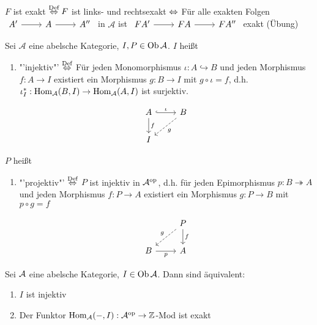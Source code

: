 \begin{anm}
	$F$ ist exakt $\overset{\text{Def}}{\Leftrightarrow} F$ ist links- und rechtsexakt $\Leftrightarrow$ Für alle exakten Folgen $\begin{tikzcd}
	A' \arrow{r} & A \arrow{r} & A''
	\end{tikzcd}$ in $\mathcal{A}$ ist $\begin{tikzcd}
	FA' \arrow{r} & FA \arrow{r} & FA''
	\end{tikzcd}$ exakt (Übung)
\end{anm}
\begin{df}
	Sei $\mathcal{A}$ eine abelsche Kategorie, $I,P \in \text{Ob}\,\mathcal{A}$. $I$ heißt
	\begin{enumerate}
		\item[] 
		 \begin{minipage}[t]{0.7\textwidth}
		"'injektiv"' $\overset{\text{Def}}{\Leftrightarrow}$ Für jeden Monomorphismus $\iota: A \hookrightarrow B$ und jeden Morphismus $f: A \to I$ existiert ein Morphismus $g:B \to I$ mit $g\circ \iota = f$, d.h. $\iota_I^*: \operatorname{Hom}_{\mathcal{A}}(B,I) \to \operatorname{Hom}_{\mathcal{A}}(A,I)$ ist surjektiv.	
		\end{minipage}
		\begin{minipage}[t]{0.3\textwidth} 
			$$\begin{tikzcd}
			A \arrow[hook]{r}{\iota} \arrow{d}{f} & B\arrow[dashed]{dl}{g} \\
			I & 
			\end{tikzcd}$$
		\end{minipage}
	\end{enumerate}
	$P$ heißt
	\begin{enumerate}

	\item[] \begin{minipage}[t]{0.7\textwidth}
		"'projektiv"' $\overset{\text{Def}}{\Leftrightarrow}$ $P$ ist injektiv in $\mathcal{A}^\text{op}$, d.h. für jeden Epimorphismus $p: B\twoheadrightarrow A$ und jeden Morphismus $f:P \to A$ existiert ein Morphismus $g:P \to B$ mit $p \circ g = f$
	\end{minipage}
	\begin{minipage}[t]{0.3\textwidth} 
		$$\begin{tikzcd}
		& P\arrow[dashed, swap]{dl}{g} \arrow{d}{f} \\
		B \arrow[swap]{r}{p} & A
		\end{tikzcd}$$
	\end{minipage}
	\end{enumerate}
\end{df}
\begin{bem}
	Sei $\mathcal{A}$ eine abelsche Kategorie, $I\in \text{Ob}\,\mathcal{A}$. Dann sind äquivalent:
	\begin{enumerate}[label= \roman*)]
		\item $I$ ist injektiv
		\item Der Funktor $\operatorname{Hom}_{\mathcal{A}}(-, I): \mathcal{A}^\text{op} \to \mathbb{Z}$-Mod ist exakt
	\end{enumerate}
\end{bem}
